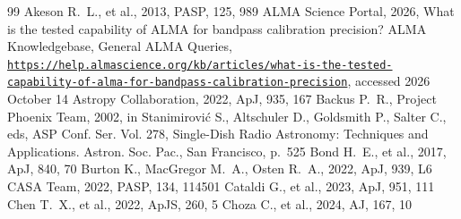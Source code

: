 \documentclass[twocolumn,twocolappendix,numberedappendix,appendixfloats]{openjournal}
\begin{document}
%
%
%
%
%
%
\begin{thebibliography}{99}
 Akeson R.~L., et al., 2013, PASP, 125, 989
 ALMA Science Portal, 2026, What is the tested capability of ALMA for bandpass calibration precision? ALMA Knowledgebase, General ALMA Queries, \href{https://help.almascience.org/kb/articles/what-is-the-tested-capability-of-alma-for-bandpass-calibration-precision}{\texttt{https://help.almascience.org/\allowbreak kb/\allowbreak articles/\allowbreak what-is-the-tested-\allowbreak capability-of-alma-for-\allowbreak bandpass-calibration-\allowbreak precision}}, accessed 2026 October 14
 Astropy Collaboration, 2022, ApJ, 935, 167
 Backus P.~R., Project Phoenix Team, 2002, in Stanimirovi\'{c} S., Altschuler D., Goldsmith P., Salter C., eds, ASP Conf. Ser. Vol. 278, Single-Dish Radio Astronomy: Techniques and Applications. Astron. Soc. Pac., San Francisco, p.~525
 Bond H.~E., et al., 2017, ApJ, 840, 70
 Burton K., MacGregor M.~A., Osten R.~A., 2022, ApJ, 939, L6
 CASA Team, 2022, PASP, 134, 114501
 Cataldi G., et al., 2023, ApJ, 951, 111
 Chen T.~X., et al., 2022, ApJS, 260, 5
 Choza C., et al., 2024, AJ, 167, 10

\end{thebibliography}
\end{document}
